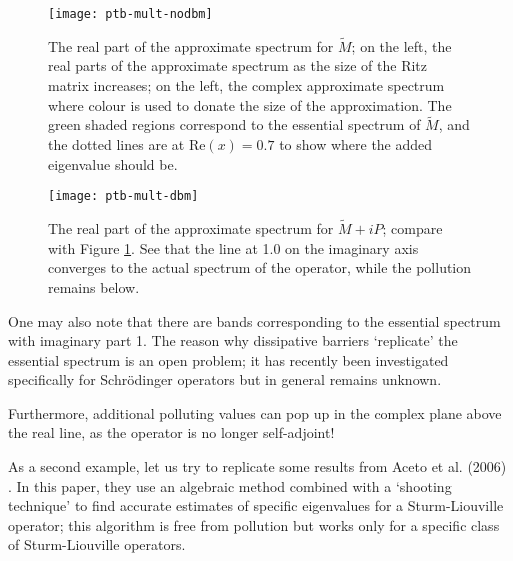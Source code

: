 \documentclass[../main.tex]{subfiles}
\begin{document}
\begin{figure}[p!] 
\texttt{[image: ptb-mult-nodbm]}
\caption{The real part of the approximate spectrum for $\tilde{M}$; on the
	left, the real parts of the approximate
	spectrum as the size of the Ritz matrix increases; on the left, the
	complex approximate spectrum where colour is used to donate the size of
	the approximation. The green shaded regions correspond to the essential
	spectrum of $\tilde{M}$, and the dotted lines are at $\mathrm{Re}(x) =
  0.7$ to show where the added eigenvalue should be.} 
\label{fig:nodbm}
\end{figure}

\begin{figure}[p!] 
\texttt{[image: ptb-mult-dbm]}
\caption{The real part of the approximate spectrum for $\tilde{M}+iP$; compare
	with Figure \ref{fig:nodbm}. See that the line at 1.0 on the imaginary
	axis converges to the actual spectrum of the operator, while the
	pollution remains below.}
\label{fig:dbm}
\end{figure}
\clearpage

\begin{remark}
One may also note that there are bands corresponding to the
essential spectrum with imaginary part 1. The reason why dissipative
barriers `replicate' the essential spectrum is an open problem; it has
recently been investigated specifically for Schr\"odinger operators
\cite{stepanenko2022spectral} but in general remains unknown.

Furthermore, additional polluting values can pop up in the complex plane
above the real line, as the operator is no longer self-adjoint!
\end{remark}

As a second example, let us try to replicate some results from Aceto et al.
(2006) \cite{aceto2006numerical}. In this paper, they use an algebraic method
combined with a `shooting technique' to find accurate estimates of specific
eigenvalues for a Sturm-Liouville operator; this algorithm is free from
pollution but works only for a specific class of Sturm-Liouville operators.
\end{document}
